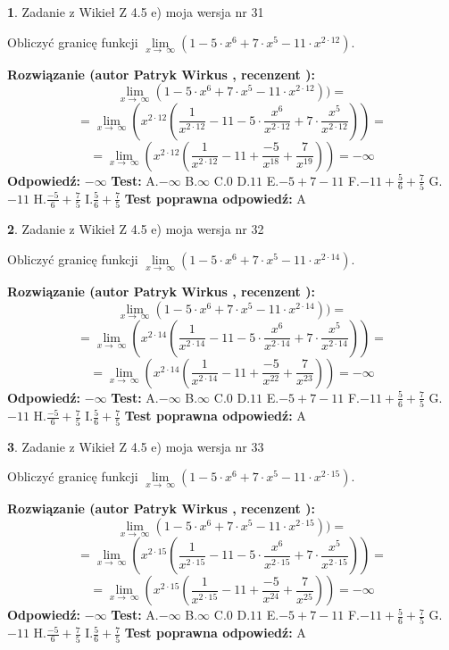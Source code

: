 \documentclass[12pt, a4paper]{article}
\theoremstyle{definition} %
\newtheorem{zad}{}
\newcommand{\zadStart}[1]{\begin{zad}#1\newline}
\newcommand{\zadStop}{\end{zad}}
\newcommand{\rozwStart}[2]{\noindent \textbf{Rozwiązanie (autor #1 , recenzent #2): }\newline}
\newcommand{\rozwStop}{\newline}
\newcommand{\odpStart}{\noindent \textbf{Odpowiedź:}\newline}
\newcommand{\odpStop}{\newline}
\newcommand{\testStart}{\noindent \textbf{Test:}\newline}
\newcommand{\testStop}{\newline}
\newcommand{\kluczStart}{\noindent \textbf{Test poprawna odpowiedź:}\newline}
\newcommand{\kluczStop}{\newline}
\begin{document}
\zadStart{Zadanie z Wikieł Z 4.5 e) moja wersja nr 31}



Obliczyć granicę funkcji  $\lim\limits_{x\to\ \infty}(1 - 5 \cdot x^{6}+7 \cdot x^{5}- 11 \cdot x^{2\cdot12})$.
\zadStop
\rozwStart{Patryk Wirkus}{}
$$\lim\limits_{x\to\ \infty}(1 - 5 \cdot x^{6}+7 \cdot x^{5}- 11 \cdot x^{2\cdot12}))=$$
$$=\lim\limits_{x\to\ \infty}(x^{2\cdot12}(\frac{1}{x^{2\cdot12}}-11 -5 \cdot \frac{x^{6}}{x^{2\cdot12}}+7 \cdot \frac{x^{5}}{x^{2\cdot12}}))=$$
$$=\lim\limits_{x\to\ \infty}(x^{2\cdot12}(\frac{1}{x^{2\cdot12}}-11 + \frac{-5}{x^{18}}+ \frac{7}{x^{19}}))=-\infty$$
\rozwStop
\odpStart
$-\infty$
\odpStop
\testStart
A.$-\infty$ B.$\infty$ C.$0$ D.$11$ E.$-5 + 7 - 11$
F.$-11+\frac{5}{6}+\frac{7}{5}$ G.$-11$
H.$\frac{-5}{6}+\frac{7}{5}$
I.$\frac{5}{6}+\frac{7}{5}$
\testStop
\kluczStart
A
\kluczStop



\zadStart{Zadanie z Wikieł Z 4.5 e) moja wersja nr 32}



Obliczyć granicę funkcji  $\lim\limits_{x\to\ \infty}(1 - 5 \cdot x^{6}+7 \cdot x^{5}- 11 \cdot x^{2\cdot14})$.
\zadStop
\rozwStart{Patryk Wirkus}{}
$$\lim\limits_{x\to\ \infty}(1 - 5 \cdot x^{6}+7 \cdot x^{5}- 11 \cdot x^{2\cdot14}))=$$
$$=\lim\limits_{x\to\ \infty}(x^{2\cdot14}(\frac{1}{x^{2\cdot14}}-11 -5 \cdot \frac{x^{6}}{x^{2\cdot14}}+7 \cdot \frac{x^{5}}{x^{2\cdot14}}))=$$
$$=\lim\limits_{x\to\ \infty}(x^{2\cdot14}(\frac{1}{x^{2\cdot14}}-11 + \frac{-5}{x^{22}}+ \frac{7}{x^{23}}))=-\infty$$
\rozwStop
\odpStart
$-\infty$
\odpStop
\testStart
A.$-\infty$ B.$\infty$ C.$0$ D.$11$ E.$-5 + 7 - 11$
F.$-11+\frac{5}{6}+\frac{7}{5}$ G.$-11$
H.$\frac{-5}{6}+\frac{7}{5}$
I.$\frac{5}{6}+\frac{7}{5}$
\testStop
\kluczStart
A
\kluczStop



\zadStart{Zadanie z Wikieł Z 4.5 e) moja wersja nr 33}



Obliczyć granicę funkcji  $\lim\limits_{x\to\ \infty}(1 - 5 \cdot x^{6}+7 \cdot x^{5}- 11 \cdot x^{2\cdot15})$.
\zadStop
\rozwStart{Patryk Wirkus}{}
$$\lim\limits_{x\to\ \infty}(1 - 5 \cdot x^{6}+7 \cdot x^{5}- 11 \cdot x^{2\cdot15}))=$$
$$=\lim\limits_{x\to\ \infty}(x^{2\cdot15}(\frac{1}{x^{2\cdot15}}-11 -5 \cdot \frac{x^{6}}{x^{2\cdot15}}+7 \cdot \frac{x^{5}}{x^{2\cdot15}}))=$$
$$=\lim\limits_{x\to\ \infty}(x^{2\cdot15}(\frac{1}{x^{2\cdot15}}-11 + \frac{-5}{x^{24}}+ \frac{7}{x^{25}}))=-\infty$$
\rozwStop
\odpStart
$-\infty$
\odpStop
\testStart
A.$-\infty$ B.$\infty$ C.$0$ D.$11$ E.$-5 + 7 - 11$
F.$-11+\frac{5}{6}+\frac{7}{5}$ G.$-11$
H.$\frac{-5}{6}+\frac{7}{5}$
I.$\frac{5}{6}+\frac{7}{5}$
\testStop
\kluczStart
A
\kluczStop
\end{document}
